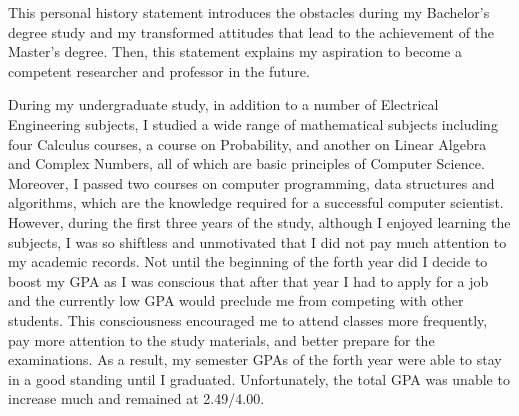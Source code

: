 \documentclass[a4paper,10pt]{report}
\begin{document}

\vspace{0.4cm}
This personal history statement introduces the obstacles during my Bachelor's degree study and my transformed attitudes that lead to the achievement of the Master's degree. Then, this statement explains my aspiration to become a competent researcher and professor in the future.

\vspace{0.2cm}
During my undergraduate study, in addition to a number of Electrical Engineering subjects, I studied a wide range of mathematical subjects including four Calculus courses, a course on Probability, and another on Linear Algebra and Complex Numbers, all of which are basic principles of Computer Science. Moreover, I passed two courses on computer programming, data structures and algorithms, which are the knowledge required for a successful computer scientist. However, during the first three years of the study, although I enjoyed learning the subjects, I was so shiftless and unmotivated that I did not pay much attention to my academic records. Not until the beginning of the forth year did I decide to boost my GPA as I was conscious that after that year I had to apply for a job and the currently low GPA would preclude me from competing with other students. This consciousness encouraged me to attend classes more frequently, pay more attention to the study materials, and better prepare for the examinations. As a result, my semester GPAs of the forth year were able to stay in a good standing until I graduated. Unfortunately, the total GPA was unable to increase much and remained at 2.49/4.00. 
\end{document}
